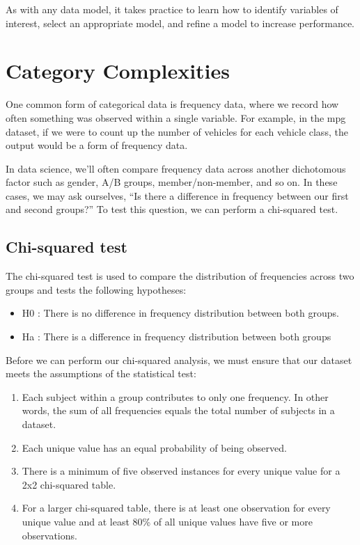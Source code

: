 \documentclass[11pt]{article}
\begin{document}
As with any data model, it takes practice to learn how to identify variables of interest, select an appropriate model, and refine a model to increase performance.

\section{Category Complexities}
\label{sec:orgd1c5b22}

One common form of categorical data is frequency data, where we record how often something was observed within a single variable. For example, in the mpg dataset, if we were to count up the number of vehicles for each vehicle class, the output would be a form of frequency data.

In data science, we'll often compare frequency data across another dichotomous factor such as gender, A/B groups, member/non-member, and so on. In these cases, we may ask ourselves, ``Is there a difference in frequency between our first and second groups?'' To test this question, we can perform a chi-squared test.

\subsection{Chi-squared test}
\label{sec:org7f25ce7}

The chi-squared test is used to compare the distribution of frequencies across two groups and tests the following hypotheses:

\begin{itemize}
\item H0 : There is no difference in frequency distribution between both groups.
\item Ha : There is a difference in frequency distribution between both groups
\end{itemize}

Before we can perform our chi-squared analysis, we must ensure that our dataset meets the assumptions of the statistical test:

\begin{enumerate}
\item Each subject within a group contributes to only one frequency. In other words, the sum of all frequencies equals the total number of subjects in a dataset.
\item Each unique value has an equal probability of being observed.
\item There is a minimum of five observed instances for every unique value for a 2x2 chi-squared table.
\item For a larger chi-squared table, there is at least one observation for every unique value and at least 80\% of all unique values have five or more observations.
\end{enumerate}
\end{document}
